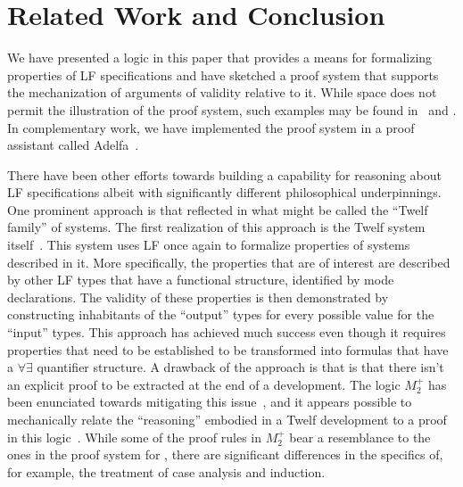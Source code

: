 \section{Related Work and Conclusion}\label{sec:conclusion}

We have presented a logic in this paper that provides
a means for formalizing properties of LF specifications and have
sketched a proof system that supports the mechanization of arguments
of validity relative to it. 
%
While space does not permit the illustration of the proof
system, such examples may be found in~\cite{nadathur21arxiv} and
\cite{southern21phd}. 
%
In complementary work, we have implemented the proof system in a proof
assistant called Adelfa~\cite{southern21phd,southern21lfmtp}. 

There have been other efforts towards building a capability for
reasoning about LF specifications albeit with significantly different
philosophical underpinnings. 
%
One prominent approach is that reflected in what might be called the
``Twelf family'' of systems.
%
The first realization of this approach is the Twelf system
itself~\cite{pfenning99cade}. 
%
This system uses LF once again to formalize properties of systems
described in it.
%
More specifically, the properties that are of interest are described
by other LF types that have a functional structure, identified by mode
declarations. 
%
The validity of these properties is then demonstrated by constructing
inhabitants of the ``output'' types for every possible value for the
``input'' types.
%
This approach has achieved much success even though it requires
properties that need to be established to be transformed into formulas
that have a $\forall\exists$ quantifier structure.
%
A drawback of the approach is that is that there isn't an
explicit proof to be extracted at the end of a development.
%
The logic $M_2^+$ has been enunciated towards mitigating this
issue~\cite{schurmann00phd}, and it appears possible to mechanically 
relate the ``reasoning'' embodied in a Twelf development to a proof in
this logic~\cite{wang13lfmtp}.
%
While some of the proof rules in $M_2^+$ bear a resemblance to the
ones in the proof system for \logic, there are significant differences
in the specifics of, for example, the treatment of case analysis and
induction.

